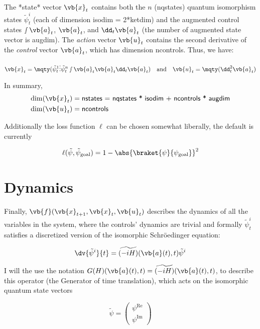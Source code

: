 \documentclass{article}
\newcommand{\isopsi}{\tilde \psi}
\begin{document}
The *state* vector $\vb{x}_t$ contains both the $n$ (\textsf{nqstates}) quantum isomorphism states $\isopsi^i_t$ (each of dimension \textsf{isodim = 2*ketdim}) and the augmented control states $\smallint \vb{a}_t$, $\vb{a}_t$, and $\dd_t \vb{a}_t$ (the number of augmented state vector is \textsf{augdim}). The \textit{action} vector $\vb{u}_t$ contains the second derivative of the \textit{control} vector $\vb{a}_t$, which has dimension \textsf{ncontrols}. Thus, we have:

\begin{equation}
  \vb{x}_t = \mqty(
    \isopsi^1_t \\ 
    \vdots \\ 
    \isopsi^n_t \\ 
    \smallint \vb{a}_t \\ 
    \vb{a}_t \\ 
    \dd_t \vb{a}_t 
  )
  \quad \text{and} \quad 
  \vb{u}_t = \mqty(
    \dd^2_t \vb{a}_t
  )
\end{equation}

In summary, 
\begin{align*}
  \dim(\vb{x}_t) &= \textsf{nstates = nqstates * isodim + ncontrols * augdim} \\
  \dim(\vb{u}_t) &= \textsf{ncontrols}
\end{align*}

Additionally the loss function $\ell$ can be chosen somewhat liberally, the default is currently

$$
\ell(\isopsi, \isopsi_{\text{goal}}) = 1 - \abs{\braket{\psi}{\psi_\text{goal}}}^2
$$


\newpage
\section{Dynamics}

Finally, $\vb{f}(\vb{x}_{t+1}, \vb{x}_t, \vb{u}_t)$ describes the dynamics of all the variables in the system, where the controls' dynamics are trivial and formally $\isopsi^i_t$ satisfies a discretized version of the isomorphic Schr\"oedinger equation:

$$
\dv{\isopsi^i}{t} = \widetilde{(- i H)}(\vb{a}(t), t) \isopsi^i
$$

I will the use the notation $G(H)(\vb{a}(t), t) = \widetilde{(- i H)}(\vb{a}(t), t)$, to describe this operator (the Generator of time translation), which acts on the isomorphic quantum state vectors 

$$
\isopsi = \begin{pmatrix} \psi^{\mathrm{Re}} \\ \psi^{\mathrm{Im}} \end{pmatrix}
$$ 
\end{document}
